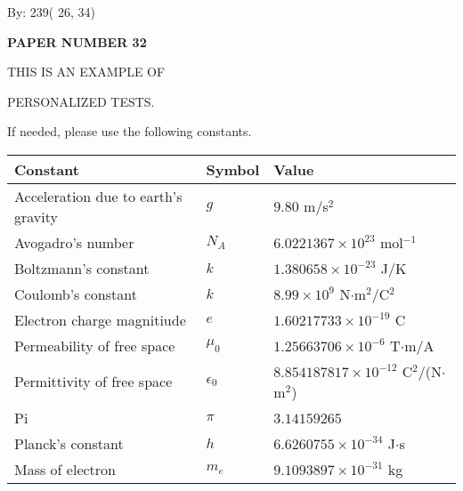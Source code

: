 \documentclass[12pt]{article}
\begin{document}
   
\hspace{1.0in} By: 
         239(         26,          34)
   
   
   
   
\newpage 
\setcounter{page}{ 
    32001 } 
   
   
   
   
 {\textbf{ \Large{ PAPER NUMBER          32 }}}
   
   
\vspace{0.2in}
   
   
   
   
   
   
   
   
 \vspace{0.2in}
 
 
{\Huge  THIS IS AN EXAMPLE OF}
 
{\Huge  PERSONALIZED TESTS. }
 
If needed, please use the following constants.
 
 
 
\noindent\begin{tabular}{|l|l|l|}
\hline
Constant & Symbol & Value \\
\hline
Acceleration due to earth's gravity &
$g$ &
 $ 9.80 $
m/s$^2$ \\
\hline
Avogadro's number &
$N_A$ &
 $ 6.0221367 \times 10^{23} $
mol$^{-1}$ \\
\hline
Boltzmann's constant &
$k$ &
 $ 1.380658 \times 10^{-23} $
J/K \\
\hline
Coulomb's constant &
$k$ &
 $ 8.99 \times 10^{9} $
N$\cdot $m$^2$/C$^2$ \\
\hline
Electron charge magnitiude &
$e$ &
 $ 1.60217733 \times 10^{-19} $
C \\
\hline
Permeability of free space &
$\mu _0$ &
 $ 1.25663706 \times 10^{-6} $
T$\cdot $m/A \\
\hline
Permittivity of free space &
$\epsilon _0$ &
 $ 8.854187817 \times 10^{-12} $
C$^2$/(N$\cdot $m$^2$) \\
\hline
Pi &
$\pi$ &
 $ 3.14159265 $
$ $ \\
\hline
Planck's constant &
$h$ &
 $ 6.6260755 \times 10^{-34} $
J$\cdot $s \\
\hline
Mass of electron &
$m_e$ &
 $ 9.1093897 \times 10^{-31} $
kg \\
\hline
\end{tabular}
 
\end{document}
